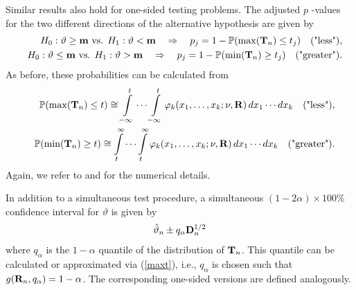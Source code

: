 \documentclass[12pt,a4paper]{article}
\begin{document}
Similar results also hold for one-sided testing problems. The adjusted $p$%
-values for the two different directions of the alternative hypothesis are
given by 
\begin{eqnarray*}
& & H_0: \vartheta \ge \mathbf{m} \text{ vs. } H_1: \vartheta < \mathbf{m} \quad
\Rightarrow \quad p_j = 1 - \mathbb{P}(\max(\mathbf{T}_n) \le t_j) \quad \text{("less")}, \\
& & H_0: \vartheta \le \mathbf{m} \text{ vs. } H_1: \vartheta > \mathbf{m} \quad
\Rightarrow \quad p_j = 1 - \mathbb{P}(\min(\mathbf{T}_n) \ge t_j) \quad \text{("greater")}.
\end{eqnarray*}
As before, these probabilities can be calculated from 
\begin{eqnarray*}
& & \mathbb{P}(\max(\mathbf{T}_n) \le t) \cong\int\limits_{-\infty}^t \cdots
\int\limits_{-\infty}^t \varphi_k(x_1, \dots, x_k; \nu, \mathbf{R}) \, dx_1 \cdots
dx_k \quad \text{("less")}, \\
& & \mathbb{P}(\min(\mathbf{T}_n) \ge t) \cong \int\limits_{t}^\infty \cdots
\int\limits_{t}^\infty \varphi_k(x_1, \dots, x_k; \nu, \mathbf{R}) \, dx_1 \cdots
dx_k \quad \text{("greater")}.
\end{eqnarray*}
Again, we refer to \cite{Genz1992,GenzBretz1999,BretzGenzHothorn2001} and 
\cite{GenzBretz2002} for the numerical details.


In addition to a simultaneous test procedure, a simultaneous $(1 - 2\alpha)
\times 100\%$ confidence interval for $\vartheta$ is given by 
\begin{eqnarray*}
\hat{\vartheta}_n \pm q_\alpha \mathbf{D}_n^{1/2}
\end{eqnarray*}
where $q_\alpha$ is the $1 - \alpha$ quantile of the distribution of $\mathbf{T}_n$.
This quantile can be calculated or approximated via (\ref{maxt}), i.e.,
$q_\alpha$ is chosen such that $g(\mathbf{R}_n, q_\alpha) = 1 - \alpha$. 
The corresponding one-sided versions are defined analogously.
\end{document}
